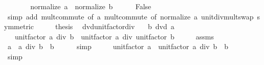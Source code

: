 \begin{isabellebody}
\ \ \isamarkupfalse%
\ \isamarkupfalse%
\ {\isachardoublequoteopen}{\isasymdots}\ {\isacharequal}{\kern0pt}\ normalize\ a\ {\isacharasterisk}{\kern0pt}\ normalize\ b{\isachardoublequoteclose}\isanewline
\ \ \ \ \isamarkupfalse%
\ False\isanewline
\ \ \ \ \isamarkupfalse%
\ {\isacharparenleft}{\kern0pt}simp\ add{\isacharcolon}{\kern0pt}\ mult{\isachardot}{\kern0pt}commute\ {\isacharbrackleft}{\kern0pt}of\ a{\isacharbrackright}{\kern0pt}\ mult{\isachardot}{\kern0pt}commute\ {\isacharbrackleft}{\kern0pt}of\ {\isachardoublequoteopen}normalize\ a{\isachardoublequoteclose}{\isacharbrackright}{\kern0pt}\ unit{\isacharunderscore}{\kern0pt}div{\isacharunderscore}{\kern0pt}mult{\isacharunderscore}{\kern0pt}swap\ {\isacharbrackleft}{\kern0pt}symmetric{\isacharbrackright}{\kern0pt}{\isacharparenright}{\kern0pt}\isanewline
\ \ \isamarkupfalse%
\ \isamarkupfalse%
\ {\isacharquery}{\kern0pt}thesis\ \isacommand{{\isachardot}{\kern0pt}}\isamarkupfalse%
\isanewline
{}\isamarkupfalse%
%
\endisatagproof
{\isafoldproof}%
%
\isadelimproof
\isanewline
%
\endisadelimproof
\isanewline
{}\isamarkupfalse%
\ dvd{\isacharunderscore}{\kern0pt}unit{\isacharunderscore}{\kern0pt}factor{\isacharunderscore}{\kern0pt}div{\isacharcolon}{\kern0pt}\isanewline
\ \ \ {\isachardoublequoteopen}b\ dvd\ a{\isachardoublequoteclose}\isanewline
\ \ \ {\isachardoublequoteopen}unit{\isacharunderscore}{\kern0pt}factor\ {\isacharparenleft}{\kern0pt}a\ div\ b{\isacharparenright}{\kern0pt}\ {\isacharequal}{\kern0pt}\ unit{\isacharunderscore}{\kern0pt}factor\ a\ div\ unit{\isacharunderscore}{\kern0pt}factor\ b{\isachardoublequoteclose}\isanewline
%
\isadelimproof
%
\endisadelimproof
%
\isatagproof
{}\isamarkupfalse%
\ {\isacharminus}{\kern0pt}\isanewline
\ \ \isamarkupfalse%
\ assms\ \isamarkupfalse%
\ {\isachardoublequoteopen}a\ {\isacharequal}{\kern0pt}\ a\ div\ b\ {\isacharasterisk}{\kern0pt}\ b{\isachardoublequoteclose}\isanewline
\ \ \ \ \isamarkupfalse%
\ simp\isanewline
\ \ \isamarkupfalse%
\ \isamarkupfalse%
\ {\isachardoublequoteopen}unit{\isacharunderscore}{\kern0pt}factor\ a\ {\isacharequal}{\kern0pt}\ unit{\isacharunderscore}{\kern0pt}factor\ {\isacharparenleft}{\kern0pt}a\ div\ b\ {\isacharasterisk}{\kern0pt}\ b{\isacharparenright}{\kern0pt}{\isachardoublequoteclose}\isanewline
\ \ \ \ \isamarkupfalse%
\ simp\isanewline

\end{isabellebody}
